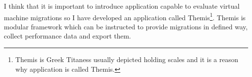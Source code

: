 I think that it is important to introduce application capable to evaluate virtual machine migrations so I have developed an application called Themis\footnote{Themis is Greek Titaness usually depicted holding scales and it is a reason why application is called Themis.}. Themis is modular framework which can be instructed to provide migrations in defined way, collect performance data and export them.
